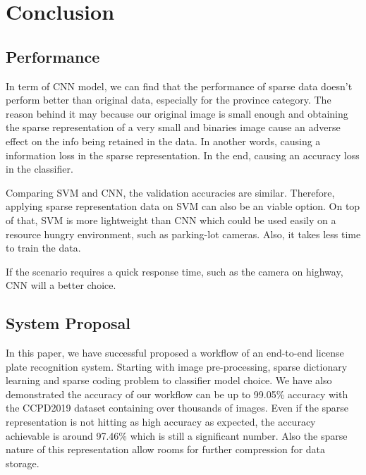 
\section{Conclusion}
\subsection{Performance}
In term of CNN model, we can find that the performance of sparse data doesn't perform better than original data, 
especially for the province category. The reason behind it may because our original image is small enough 
and obtaining the sparse representation of a very small and binaries image cause an adverse effect on the 
info being retained in the data. In another words, causing a information loss in the sparse representation.
In the end, causing an accuracy loss in the classifier. 

Comparing SVM and CNN, the validation accuracies are similar. Therefore, applying sparse representation data
on SVM can also be an viable option. On top of that, SVM is more lightweight than CNN which could be used
easily on a resource hungry environment, such as parking-lot cameras. Also, it takes less time to train the data. 

If the scenario requires a quick response time, such as the camera on highway, CNN will a better choice. 

\subsection{System Proposal}
In this paper, we have successful proposed a workflow of an end-to-end license plate
recognition system. Starting with image pre-processing, sparse dictionary learning and sparse coding problem to 
classifier model choice. We have also demonstrated the accuracy of our workflow can be up to 99.05\% accuracy 
with the CCPD2019\cite{xu2018towards, li2017endtoend} dataset containing over thousands of images.
Even if the sparse representation is not hitting as high accuracy as expected, the accuracy achievable is around
97.46\% which is still a significant number. Also the sparse nature of this representation allow rooms for 
further compression for data storage. 




